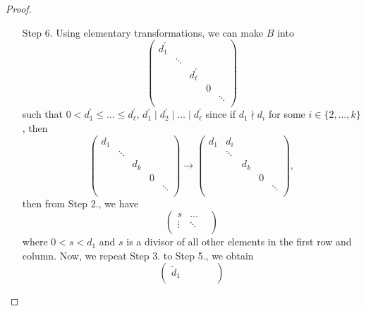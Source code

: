\begin{proof}
\begin{enumerate}
		\item[Step 6.] Using elementary transformations, we can make \(B\) into
			\[
				\begin{pmatrix}
					d_1^\prime &        &                  &   &        \\
					           & \ddots &                  &   &        \\
					           &        & d_{\ell }^\prime &   &        \\
					           &        &                  & 0 &        \\
					           &        &                  &   & \ddots \\
				\end{pmatrix}
			\]
			such that \(0< d_1^\prime \leq \ldots \leq d_{\ell }^\prime\), \(d_1^\prime \mid d_2^\prime \mid \ldots \mid d_{\ell }^\prime\) since if \(d_1\nmid d_{i} \) for some \(i\in \{2, \ldots , k \}\), then
			\[
				\begin{pmatrix}
					d_1 &        &       &   &        \\
					    & \ddots &       &   &        \\
					    &        & d_{k} &   &        \\
					    &        &       & 0 &        \\
					    &        &       &   & \ddots \\
				\end{pmatrix}\to \begin{pmatrix}
					d_1 & d_{i}  &       &   &        \\
					    & \ddots &       &   &        \\
					    &        & d_{k} &   &        \\
					    &        &       & 0 &        \\
					    &        &       &   & \ddots \\
				\end{pmatrix},
			\]
			then from Step 2., we have
			\[
				\begin{pmatrix}
					s      & \ldots & \\
					\vdots & \ddots   \\
				\end{pmatrix}
			\]
			where \(0 < s < d_1\) and \(s\) is a divisor of all other elements in the first row and column. Now, we repeat Step 3. to Step 5., we obtain
			\[
				\begin{pmatrix}
					\widetilde{d} _1 &        &                    &   &        \\

\end{pmatrix}\]
\end{enumerate}
\end{proof}
